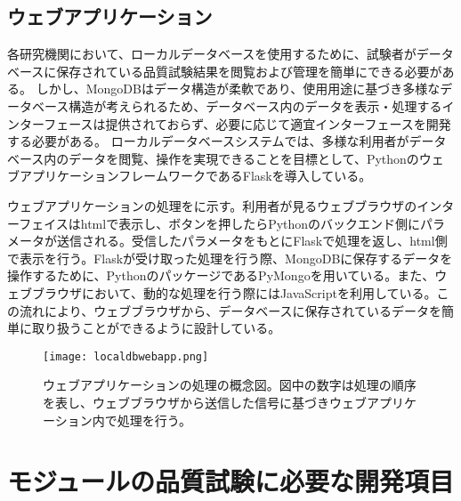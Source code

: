 \subsection{ウェブアプリケーション}
\label{sec:flask}

各研究機関において、ローカルデータベースを使用するために、試験者がデータベースに保存されている品質試験結果を閲覧および管理を簡単にできる必要がある。
しかし、MongoDBはデータ構造が柔軟であり、使用用途に基づき多様なデータベース構造が考えられるため、データベース内のデータを表示・処理するインターフェースは提供されておらず、必要に応じて適宜インターフェースを開発する必要がある。
ローカルデータベースシステムでは、多様な利用者がデータベース内のデータを閲覧、操作を実現できることを目標として、PythonのウェブアプリケーションフレームワークであるFlaskを導入している。

ウェブアプリケーションの処理をに示す。利用者が見るウェブブラウザのインターフェイスはhtmlで表示し、ボタンを押したらPythonのバックエンド側にパラメータが送信される。受信したパラメータをもとにFlaskで処理を返し、html側で表示を行う。Flaskが受け取った処理を行う際、MongoDBに保存するデータを操作するために、PythonのパッケージであるPyMongoを用いている。また、ウェブブラウザにおいて、動的な処理を行う際にはJavaScriptを利用している。この流れにより、ウェブブラウザから、データベースに保存されているデータを簡単に取り扱うことができるように設計している。

\begin{figure}[tbp]
  \centering
  \texttt{[image: localdbwebapp.png]}
  \caption[ウェブアプリケーションの処理の概念図]{ウェブアプリケーションの処理の概念図。図中の数字は処理の順序を表し、ウェブブラウザから送信した信号に基づきウェブアプリケーション内で処理を行う。}
  \label{fig:webapp}
\end{figure}

\section{モジュールの品質試験に必要な開発項目}
\label{sec:okubottan}

